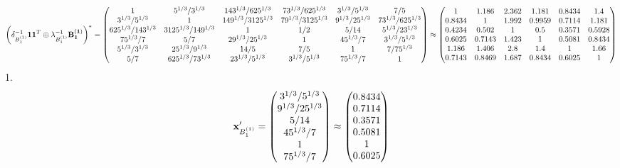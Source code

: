\documentclass[10pt,a4paper]{article}
\begin{document}
	\[
		\left(\delta_{B_1^{(1)}}^{-1}\bold{11}^T \oplus \lambda_{B_1^{(1)}}^{-1}\bold{B_1^{(1)}}\right)^* = 
		\begin{pmatrix}
			{1}{} & {{5^ {1 / 3}}} / {{3^ {1 / 3}}} & {{14}{3^ {1 / 3}}} / {{625^ {1 / 3}}} & {{7}{3^ {1 / 3}}} / {{625^ {1 / 3}}} & {{3^ {1 / 3}}} / {{5^ {1 / 3}}} & {{7}} / {{5}} \\
			{{3^ {1 / 3}}} / {{5^ {1 / 3}}} & {1}{} & {{14}{9^ {1 / 3}}} / {{3125^ {1 / 3}}} & {{7}{9^ {1 / 3}}} / {{3125^ {1 / 3}}} & {{9^ {1 / 3}}} / {{25^ {1 / 3}}} & {{7}{3^ {1 / 3}}} / {{625^ {1 / 3}}} \\
			{{625^ {1 / 3}}} / {{14}{3^ {1 / 3}}} & {{3125^ {1 / 3}}} / {{14}{9^ {1 / 3}}} & {1}{} & {1} / {{2}} & {{5}} / {{14}} & {{5^ {1 / 3}}} / {{2}{3^ {1 / 3}}} \\
			{{75^ {1 / 3}}} / {{7}} & {{5}} / {{7}} & {{2}{9^ {1 / 3}}} / {{25^ {1 / 3}}} & {1}{} & {{45^ {1 / 3}}} / {{7}} & {{3^ {1 / 3}}} / {{5^ {1 / 3}}} \\
			{{5^ {1 / 3}}} / {{3^ {1 / 3}}} & {{25^ {1 / 3}}} / {{9^ {1 / 3}}} & {{14}} / {{5}} & {{7}} / {{5}} & {1}{} & {{7}} / {{75^ {1 / 3}}} \\
			{{5}} / {{7}} & {{625^ {1 / 3}}} / {{7}{3^ {1 / 3}}} & {{2}{3^ {1 / 3}}} / {{5^ {1 / 3}}} & {{3^ {1 / 3}}} / {{5^ {1 / 3}}} & {{75^ {1 / 3}}} / {{7}} & {1}{} \\
		\end{pmatrix}
		\approx
		\begin{pmatrix}
			1        & 1.186    & 2.362    & 1.181    & 0.8434   & 1.4      \\
			0.8434   & 1        & 1.992    & 0.9959   & 0.7114   & 1.181    \\
			0.4234   & 0.502    & 1        & 0.5      & 0.3571   & 0.5928   \\
			0.6025   & 0.7143   & 1.423    & 1        & 0.5081   & 0.8434   \\
			1.186    & 1.406    & 2.8      & 1.4      & 1        & 1.66     \\
			0.7143   & 0.8469   & 1.687    & 0.8434   & 0.6025   & 1        \\
		\end{pmatrix}
	\]
	1.
	\[
		\bold{x}'_{B_1^{(1)}} = 
		\begin{pmatrix}
			{{3^ {1 / 3}}} / {{5^ {1 / 3}}} \\
			{{9^ {1 / 3}}} / {{25^ {1 / 3}}} \\
			{{5}} / {{14}} \\
			{{45^ {1 / 3}}} / {{7}} \\
			{1}{} \\
			{{75^ {1 / 3}}} / {{7}} \\
		\end{pmatrix}
		\approx
		\begin{pmatrix}
			0.8434   \\
			0.7114   \\
			0.3571   \\
			0.5081   \\
			1        \\
			0.6025   \\
		\end{pmatrix}
	\]
\end{document}
